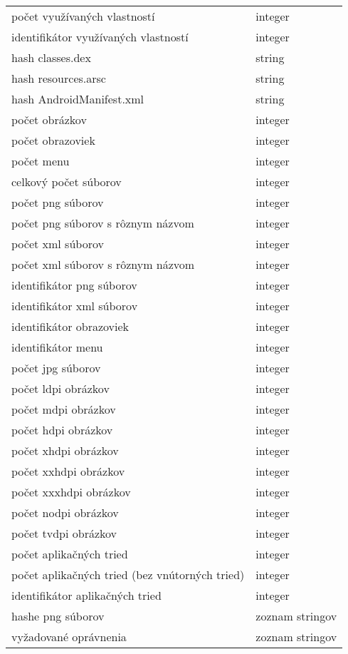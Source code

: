 \begin{longtable}{|l|p{6.3cm}|}
počet využívaných vlastností								& integer \\
identifikátor využívaných vlastností								& integer \\
hash classes.dex						& string \\
hash resources.arsc						& string \\
hash AndroidManifest.xml				& string \\
počet obrázkov							& integer \\
počet obrazoviek							& integer \\				
počet menu							& integer \\
celkový počet súborov							& integer \\
počet png súborov							& integer \\
počet png súborov s rôznym názvom							& integer \\
počet xml súborov							& integer \\
počet xml súborov s rôznym názvom							& integer \\
identifikátor png súborov 					& integer \\
identifikátor xml súborov 					& integer \\
identifikátor obrazoviek 					& integer \\
identifikátor menu 					& integer \\
počet jpg súborov 					& integer \\
počet ldpi obrázkov					& integer \\
počet mdpi obrázkov 					& integer \\
počet hdpi obrázkov 					& integer \\
počet xhdpi obrázkov 					& integer \\
počet xxhdpi obrázkov 					& integer \\
počet xxxhdpi obrázkov 					& integer \\
počet nodpi obrázkov 					& integer \\
počet tvdpi obrázkov 					& integer \\
počet aplikačných tried					& integer \\
počet aplikačných tried	(bez vnútorných tried)				& integer \\
identifikátor aplikačných tried					& integer \\
hashe png súborov					& zoznam stringov \\
vyžadované oprávnenia					& zoznam stringov 
  \label{tab:zbieraneData}
\end{longtable}